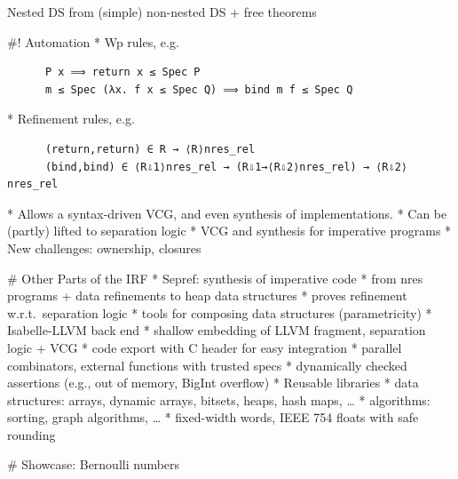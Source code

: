 \documentclass[fleqn]{beamer}
\begin{document}
  \centering
  Nested DS from (simple) non-nested DS + free theorems



#! Automation
  * Wp rules, e.g.
    \begin{lstlisting}
      P x ⟹ return x ≤ Spec P
      m ≤ Spec (λx. f x ≤ Spec Q) ⟹ bind m f ≤ Spec Q
    \end{lstlisting}

  * Refinement rules, e.g.
    \begin{lstlisting}
      (return,return) ∈ R → ⟨R⟩nres_rel
      (bind,bind) ∈ ⟨R⇩1⟩nres_rel → (R⇩1→⟨R⇩2⟩nres_rel) → ⟨R⇩2⟩nres_rel
    \end{lstlisting}

  * Allows a syntax-driven VCG, and even synthesis of implementations.
  * Can be (partly) lifted to separation logic
    * VCG and synthesis for imperative programs
    * New challenges: ownership, closures


# Other Parts of the IRF
  * Sepref: synthesis of imperative code
    * from nres programs + data refinements to heap data structures
    * proves refinement w.r.t.\ separation logic
    * tools for composing data structures (parametricity)
  * Isabelle-LLVM back end
    * shallow embedding of LLVM fragment, separation logic + VCG
    * code export with C header for easy integration
    * parallel combinators, external functions with trusted specs %
    * dynamically checked assertions (e.g., out of memory, BigInt overflow)
  * Reusable libraries
    * data structures: arrays, dynamic arrays, bitsets, heaps, hash maps, \dots
    * algorithms: sorting, graph algorithms, \dots
    * fixed-width words, IEEE 754 floats with safe rounding

# Showcase: Bernoulli numbers
\end{document}
